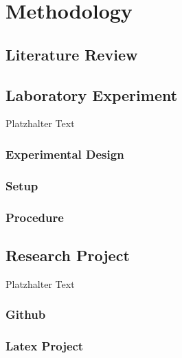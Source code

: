 \newpage

\section{Methodology} \label{methodology}
\subsection{Literature Review}

\subsection{Laboratory Experiment}
Platzhalter Text
\subsubsection{Experimental Design}

\subsubsection{Setup}

\subsubsection{Procedure}

\subsection{Research Project}
Platzhalter Text
\subsubsection{Github}

\subsubsection{Latex Project}







